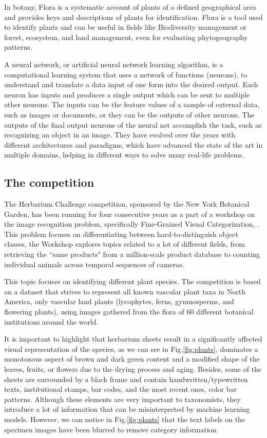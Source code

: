 \documentclass{article}
\begin{document}
In botany, Flora is a systematic account of plants of a defined geographical area and provides keys and descriptions of plants for identification. Flora is a tool used to identify plants and can be useful in fields like Biodiversity management or forest, ecosystem, and land management, even for evaluating phytogeography patterns. \cite{flora}

A neural network, or artificial neural network learning algorithm, is a computational learning system that uses a network of functions (neurons), to understand and translate a data input of one form into the desired output. Each neuron has inputs and produces a single output which can be sent to multiple other neurons. The inputs can be the feature values of a sample of external data, such as images or documents, or they can be the outputs of other neurons. The outputs of the final output neurons of the neural net accomplish the task, such as recognizing an object in an image. They have evolved over the years with different architectures and paradigms, which have advanced the state of the art in multiple domains, helping in different ways to solve many real-life problems. 
  
\subsection{The competition}
The Herbarium Challenge competition, sponsored by the New York Botanical Garden, has been running for four consecutive years as a part of a workshop on the image recognition problem, specifically Fine-Grained Visual Categorization, \cite{FGVC}. This problem focuses on differentiating between hard-to-distinguish object classes, the Workshop explores topics related to a lot of different fields, from retrieving the “same products" from a million-scale product database to counting individual animals across temporal sequences of cameras.

This topic focuses on identifying different plant species. The competition is based on a dataset that strives to represent all known vascular plant taxa in North America, only vascular land plants (lycophytes, ferns, gymnosperms, and flowering plants), using images gathered from the flora of 60 different botanical institutions around the world.

It is important to highlight that herbarium sheets result in a significantly affected visual representation of the species, as we can see in Fig.\ref{fig:plants}, dominates a monotonous aspect of brown and dark green content and a modified shape of the leaves, fruits, or flowers due to the drying process and aging. Besides, some of the sheets are surrounded by a black frame and contain handwritten/typewritten texts, institutional stamps, bar codes, and the most recent ones, color bar patterns. Although these elements are very important to taxonomists, they introduce a lot of information that can be misinterpreted by machine learning models. However, we can notice in  Fig.\ref{fig:plants} that the text labels on the specimen images have been blurred to remove category information.
\end{document}
